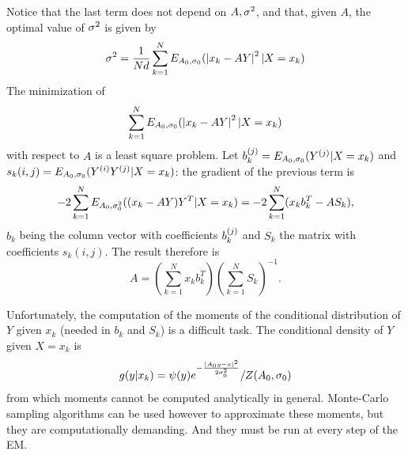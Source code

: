 Notice that the last term does not depend on $A, \sigma^2$, and that, given
$A$, the optimal value of $\sigma^2$ is given by
$$
\sigma^2 = \frac{1}{Nd} \sum_{k=1}^N E_{A_0,
\sigma_0}( \left| x_k- AY \right|^2 | X=x_k)
$$
The minimization of
$$
\sum_{k=1}^N E_{A_0,
\sigma_0}( \left| x_k- AY \right|^2 | X=x_k)
$$
with respect to $A$ is a least square problem.
Let $b_{k}^{(j)} = E_{A_0, \sigma_0}(Y^{(j)} | X=x_k)$ and $s_k(i,j) = E_{A_0,\sigma_0}(Y^{(i)}Y^{(j)}|X=x_k)$: the
gradient of the previous term is
\[
-2\sum_{k=1}^N E_{A_0, \sigma^2_0}((x_k - AY)Y^T | X=x_k) =
-2\sum_{k=1}^N (x_k b_k^T - A S_k),
\]
$b_k$ being the column vector with coefficients $b_k^{(j)}$ and $S_k$ the
matrix with coefficients $s_k(i,j)$. The result therefore is 
$$ A = \left(\sum_{k=1}^N x_k b_k^T\right)\left(\sum_{k=1}^N S_k\right)^{-1} .$$
\bigskip

Unfortunately, the computation of the moments of the conditional
distribution of $Y$ given $x_k$ (needed in $b_k $ and $S_k$) is a
difficult task. The conditional density of   $Y$ given $X=x_k$ is
$$
g(y|x_k) =  \psi(y) e^{-\frac{|A_0y - x|^2}{2\sigma_0^2} }/Z(A_0,
\sigma_0)
$$
from which moments cannot be  computed analytically in general. Monte-Carlo
sampling algorithms can be used however to approximate these moments,
but they are computationally demanding. And they must be run at
every step of the EM.

